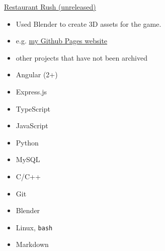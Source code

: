 \documentclass[10pt,a4paper,ragged2e,withhyper]{altacv}
\begin{document}
\begin{paracol}{2}
\divider

\small\href{https://github.com/Qarian/Restaurant-rush}{Restaurant Rush (unreleased)}
\smallskip

\begin{itemize}
    \item Used Blender to create 3D assets for the game.
\end{itemize}

\divider

\begin{itemize}
    \item e.g. \href{https://jerry-sky.github.io}{my Github Pages website}
    \item other projects that have not been archived
\end{itemize}

\switchcolumn


\begin{itemize}
\item Angular (2+)
\item Express.js
\item TypeScript
\item JavaScript
\item Python
\item MySQL
\item C/C++
\item Git
\item Blender
\item Linux, \texttt{bash}
\item Markdown
\end{itemize}





\end{paracol}
\end{document}
